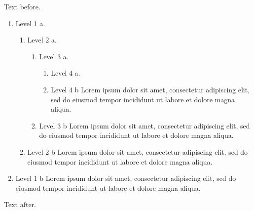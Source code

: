 \documentclass[12pt]{article}
\begin{document}
Text before.
\begin{enumerate}
\item Level 1 a.
\begin{enumerate}
\item Level 2 a.
\begin{enumerate}
\item Level 3 a.
\begin{enumerate}
\item Level 4 a.
\item Level 4 b Lorem ipsum dolor sit amet, consectetur adipiscing elit, sed do eiusmod tempor incididunt ut labore et dolore magna aliqua.
\end{enumerate}
\item Level 3 b Lorem ipsum dolor sit amet, consectetur adipiscing elit, sed do eiusmod tempor incididunt ut labore et dolore magna aliqua.
\end{enumerate}
\item Level 2 b Lorem ipsum dolor sit amet, consectetur adipiscing elit, sed do eiusmod tempor incididunt ut labore et dolore magna aliqua.
\end{enumerate}
\item Level 1 b Lorem ipsum dolor sit amet, consectetur adipiscing elit, sed do eiusmod tempor incididunt ut labore et dolore magna aliqua.
\end{enumerate}
Text after.
\end{document}
